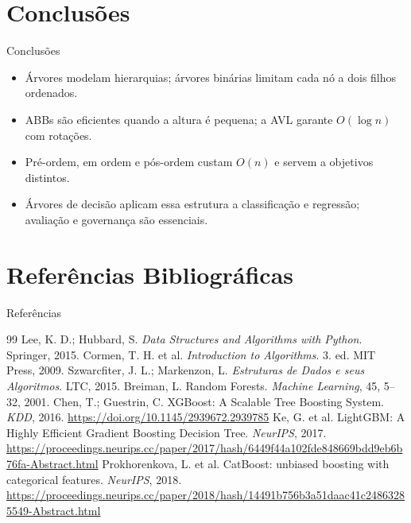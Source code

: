 \documentclass[aspectratio=43,10pt]{beamer}
\begin{document}
\section{Conclusões}
\begin{frame}{Conclusões}
  \begin{itemize}
    \item Árvores modelam hierarquias; árvores binárias limitam cada nó a dois filhos ordenados.
    \item ABBs são eficientes quando a altura é pequena; a AVL garante $O(\log n)$ com rotações.
    \item Pré-ordem, em ordem e pós-ordem custam $O(n)$ e servem a objetivos distintos.
    \item Árvores de decisão aplicam essa estrutura a classificação e regressão; avaliação e governança são essenciais.
  \end{itemize}
\end{frame}

\section{Referências Bibliográficas}
\begin{frame}[allowframebreaks]{Referências}
\scriptsize
\begin{thebibliography}{99}
 Lee, K. D.; Hubbard, S. \textit{Data Structures and Algorithms with Python}. Springer, 2015.
 Cormen, T. H. et al. \textit{Introduction to Algorithms}. 3. ed. MIT Press, 2009.
 Szwarcfiter, J. L.; Markenzon, L. \textit{Estruturas de Dados e seus Algoritmos}. LTC, 2015.
 Breiman, L. Random Forests. \textit{Machine Learning}, 45, 5--32, 2001.
 Chen, T.; Guestrin, C. XGBoost: A Scalable Tree Boosting System. \textit{KDD}, 2016. \url{https://doi.org/10.1145/2939672.2939785}
 Ke, G. et al. LightGBM: A Highly Efficient Gradient Boosting Decision Tree. \textit{NeurIPS}, 2017. \url{https://proceedings.neurips.cc/paper/2017/hash/6449f44a102fde848669bdd9eb6b76fa-Abstract.html}
 Prokhorenkova, L. et al. CatBoost: unbiased boosting with categorical features. \textit{NeurIPS}, 2018. \url{https://proceedings.neurips.cc/paper/2018/hash/14491b756b3a51daac41c24863285549-Abstract.html}
\end{thebibliography}
\end{frame}

\begin{frame}\titlepage\end{frame}
\end{document}
